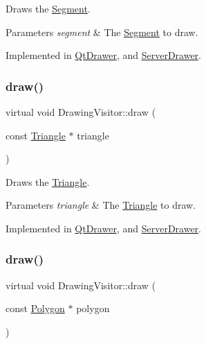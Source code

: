 Draws the \hyperlink{class_segment}{Segment}. 
\begin{DoxyParams}{Parameters}
{\em segment} & The \hyperlink{class_segment}{Segment} to draw. \\
\hline
\end{DoxyParams}


Implemented in \hyperlink{class_qt_drawer_afe2f299e83092e1d4676c8b3fd4a3452}{Qt\+Drawer}, and \hyperlink{class_server_drawer_a2bec9e70a1111d59b6c2d7de0908d780}{Server\+Drawer}.

\hypertarget{class_drawing_visitor_a178aa7e1bb9cfbd538d7de0dbfa2d4b1}{}\label{class_drawing_visitor_a178aa7e1bb9cfbd538d7de0dbfa2d4b1} 
\subsubsection{\texorpdfstring{draw()}{draw()}\hspace{0.1cm}{\footnotesize\ttfamily [3/5]}}
{\footnotesize\ttfamily virtual void Drawing\+Visitor\+::draw (\begin{DoxyParamCaption}\item[{const \hyperlink{class_triangle}{Triangle} $\ast$}]{triangle }\end{DoxyParamCaption})\hspace{0.3cm}{\ttfamily [pure virtual]}}

Draws the \hyperlink{class_triangle}{Triangle}. 
\begin{DoxyParams}{Parameters}
{\em triangle} & The \hyperlink{class_triangle}{Triangle} to draw. \\
\hline
\end{DoxyParams}


Implemented in \hyperlink{class_qt_drawer_a6d68080c84447a76b34810ca0330fd2c}{Qt\+Drawer}, and \hyperlink{class_server_drawer_aad913eff7f5c248003ef70ec8c09d2b2}{Server\+Drawer}.

\hypertarget{class_drawing_visitor_a771a2110a3afe4e87688bddd65657a46}{}\label{class_drawing_visitor_a771a2110a3afe4e87688bddd65657a46} 
\subsubsection{\texorpdfstring{draw()}{draw()}\hspace{0.1cm}{\footnotesize\ttfamily [4/5]}}
{\footnotesize\ttfamily virtual void Drawing\+Visitor\+::draw (\begin{DoxyParamCaption}\item[{const \hyperlink{class_polygon}{Polygon} $\ast$}]{polygon }\end{DoxyParamCaption})\hspace{0.3cm}{\ttfamily [pure virtual]}}

